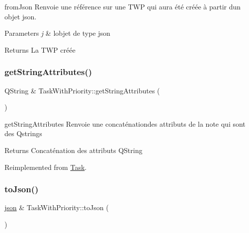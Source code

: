 from\+Json Renvoie une référence sur une T\+WP qui aura été créée à partir d\textquotesingle{}un objet json. 


\begin{DoxyParams}{Parameters}
{\em j} & l\textquotesingle{}objet de type json \\
\hline
\end{DoxyParams}
\begin{DoxyReturn}{Returns}
La T\+WP créée 
\end{DoxyReturn}
\mbox{\label{classTaskWithPriority_a8463ac90713f33e4e9ca04de18eebb8b}} 
\subsubsection{\texorpdfstring{get\+String\+Attributes()}{getStringAttributes()}}
{\footnotesize\ttfamily Q\+String \& Task\+With\+Priority\+::get\+String\+Attributes (\begin{DoxyParamCaption}{ }\end{DoxyParamCaption})\hspace{0.3cm}{\ttfamily [virtual]}}



get\+String\+Attributes Renvoie une concaténationdes attributs de la note qui sont des Qstrings 

\begin{DoxyReturn}{Returns}
Concaténation des attributs Q\+String 
\end{DoxyReturn}


Reimplemented from \hyperlink{classTask_a410f65f8d06198e75d8faec574827726}{Task}.

\mbox{\label{classTaskWithPriority_adeda4ce31e96224993db991c60fccbc7}} 
\subsubsection{\texorpdfstring{to\+Json()}{toJson()}}
{\footnotesize\ttfamily \hyperlink{classnlohmann_1_1basic__json}{json} \& Task\+With\+Priority\+::to\+Json (\begin{DoxyParamCaption}{ }\end{DoxyParamCaption})\hspace{0.3cm}{\ttfamily [virtual]}}




